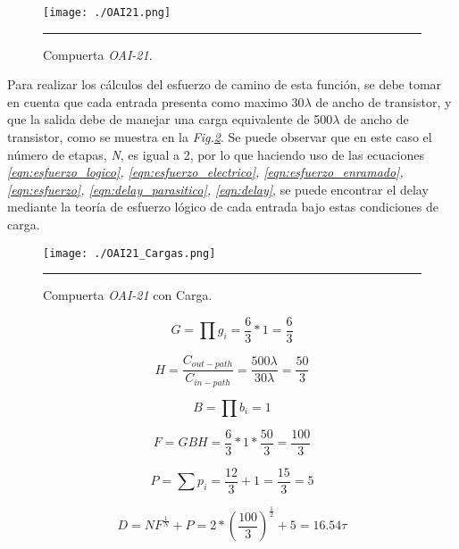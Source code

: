 \documentclass[12pt,a4paper]{article} %
\begin{document}
\begin{figure}[htbp]
  \centering
    \texttt{[image: ./OAI21.png]}
    \rule{35em}{0.5pt}
  \caption[IdealvsSim]{Compuerta \textit{OAI-21}.}
  \label{fig:OAI21}
\end{figure}

Para realizar los cálculos del esfuerzo de camino de esta función, se debe tomar en cuenta que cada entrada presenta como maximo 30$\lambda$ de ancho de transistor, y que la salida debe de manejar una carga equivalente de 500$\lambda$ de ancho de transistor, como se muestra en la \textit{Fig.\ref{fig:OAI21_Cargas}}. Se puede observar que en este caso el número de etapas, \textit{N}, es igual a 2, por lo que haciendo uso de las ecuaciones \textit{\ref{eqn:esfuerzo_logico}, \ref{eqn:esfuerzo_electrico}, \ref{eqn:esfuerzo_enramado}, \ref{eqn:esfuerzo}, \ref{eqn:delay_parasitico}, \ref{eqn:delay}}, se puede encontrar el delay mediante la teoría de esfuerzo lógico de cada entrada bajo estas condiciones de carga.\\

\begin{figure}[htbp]
  \centering
    \texttt{[image: ./OAI21\_Cargas.png]}
    \rule{35em}{0.5pt}
  \caption[IdealvsSim]{Compuerta \textit{OAI-21} con Carga.}
  \label{fig:OAI21_Cargas}
\end{figure}


\begin{equation}\label{eqn:esfuerzo_logico2}
G= \prod g_{i}= \frac{6}{3} * 1 = \frac{6}{3}
\end{equation}

\begin{equation}\label{eqn:esfuerzo_electrico2}
H= \frac{C_{out-path}}{C_{in-path}} = \frac{500\lambda}{30\lambda} = \frac{50}{3}
\end{equation}

\begin{equation}\label{eqn:esfuerzo_enramado2}
B= \prod b_{i} = 1
\end{equation}

\begin{equation}\label{eqn:esfuerzo2}
F = GBH = \frac{6}{3}*1*\frac{50}{3} = \frac{100}{3}
\end{equation}

\begin{equation}\label{eqn:delay_parasitico2}
P = \sum p_{i} = \frac{12}{3} + 1 = \frac{15}{3} = 5
\end{equation}

\begin{equation}\label{eqn:delay2}
D = NF^{\frac{1}{N}} + P = 2*(\frac{100}{3})^{\frac{1}{2}} + 5 = 16.54\tau
\end{equation}\\
\end{document}
